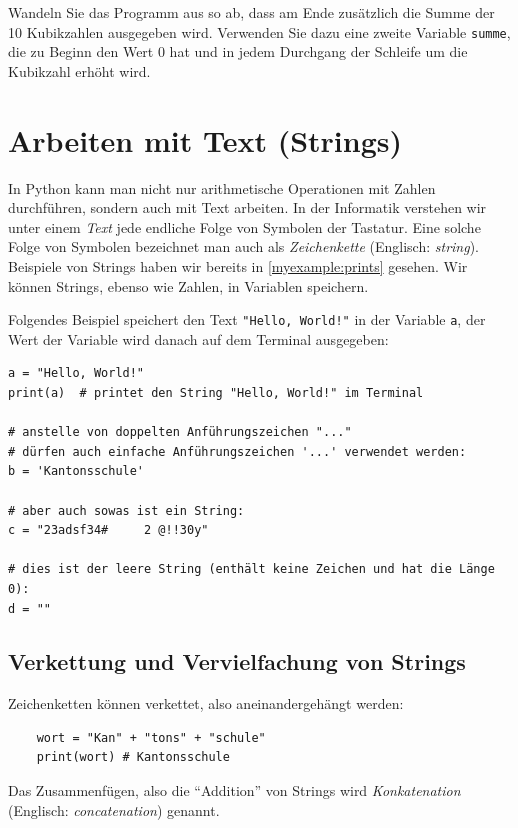 \begin{myexercise}
	Wandeln Sie das Programm aus  so ab, dass am Ende zusätzlich die Summe der 10 Kubikzahlen ausgegeben wird. Verwenden Sie dazu eine zweite Variable \lstinline|summe|, die zu Beginn den Wert 0 hat und in jedem Durchgang der Schleife um die Kubikzahl erhöht wird.
	\begin{myanswer}
		
	\end{myanswer}
\end{myexercise}
\section{Arbeiten mit Text (Strings)}
In Python kann man nicht nur arithmetische Operationen mit Zahlen durchführen, sondern auch mit Text arbeiten. In der Informatik verstehen wir unter einem \emph{Text} jede endliche Folge von Symbolen der Tastatur. Eine solche Folge von Symbolen bezeichnet man auch als \emph{Zeichenkette} (Englisch: \emph{string}). Beispiele von Strings haben wir bereits in \cref{myexample:prints} gesehen. Wir können Strings, ebenso wie Zahlen, in Variablen speichern.

\begin{myexample}\label{ex:text-in-variables}
Folgendes Beispiel speichert den Text \lstinline|"Hello, World!"| in der Variable \texttt{a}, der Wert der Variable wird danach auf dem Terminal ausgegeben:
\begin{lstlisting}
a = "Hello, World!"
print(a)  # printet den String "Hello, World!" im Terminal

# anstelle von doppelten Anführungszeichen "..."
# dürfen auch einfache Anführungszeichen '...' verwendet werden:
b = 'Kantonsschule'

# aber auch sowas ist ein String:
c = "23adsf34#     2 @!!30y"

# dies ist der leere String (enthält keine Zeichen und hat die Länge 0):
d = ""
\end{lstlisting}
\end{myexample}

\subsection{Verkettung und Vervielfachung von Strings}
Zeichenketten können verkettet, also aneinandergehängt werden:
\begin{lstlisting}
	wort = "Kan" + "tons" + "schule"
	print(wort) # Kantonsschule
\end{lstlisting}
Das Zusammenfügen, also die \enquote{Addition} von Strings wird \emph{Konkatenation} (Englisch: \emph{concatenation}) genannt.

